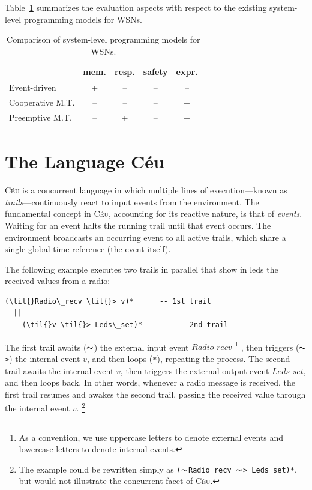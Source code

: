 \documentclass{sig-alternate-ipsn09}
\newcommand{\2}{\;\;}
\newcommand{\5}{\;\;\;\;\;}
\newcommand{\til}{$\thicksim$}
\newcommand{\CEU}{\textsc{C\'{e}u}}
\newcommand{\code}[1] {{\small{\texttt{#1}}}}
\begin{document}
Table~\ref{tab:comparison} summarizes the evaluation aspects with respect to 
the existing system-level programming models for WSNs.

\begin{table}[h]
\begin{center}
\caption{Comparison of system-level programming models for WSNs.}
\label{tab:comparison}
\begin{tabular}{ | l | c | c | c | c | }
\hline
                     &   mem.  & resp. & safety & expr. \\ \hline
    Event-driven     &    +    &   --  &   --   &   --  \\ \hline
    Cooperative M.T. &    --   &   --  &   --   &   +   \\ \hline
    Preemptive  M.T. &    --   &   +   &   --   &   +   \\ \hline
\end{tabular}
\end{center}
\end{table}

\section{The Language C\'eu}
\label{sec:ceu}

\CEU{} is a concurrent language in which multiple lines of execution---known as 
\emph{trails}---continuously react to input events from the environment.
The fundamental concept in \CEU, accounting for its reactive nature, is that of 
\emph{events}.
Waiting for an event halts the running trail until that event occurs.
The environment broadcasts an occurring event to all active trails, which share 
a single global time reference (the event itself).

The following example executes two trails in parallel that show in leds the 
received values from a radio:

\begin{Verbatim}[commandchars=\\\{\}]
    (\til{}Radio\_recv \til{}> v)*      -- 1st trail
  ||
    (\til{}v \til{}> Leds\_set)*        -- 2nd trail
\end{Verbatim}

The first trail awaits (\code{\til}) the external input event $Radio\_recv$%
\footnote{As a convention, we use uppercase letters to denote external events 
and lowercase letters to denote internal events.}%
, then triggers (\code{\til>}) the internal event $v$, and then loops 
(\code{*}), repeating the process.
The second trail awaits the internal event $v$, then triggers the external 
output event $Leds\_set$, and then loops back.
In other words, whenever a radio message is received, the first trail resumes 
and awakes the second trail, passing the received value through the internal 
event $v$.%
\footnote{
    The example could be rewritten simply as
    \code{(\til{}Radio\_recv~\til{}>~Leds\_set)*},
    but would not illustrate the concurrent facet of \CEU{}.
}
\end{document}
